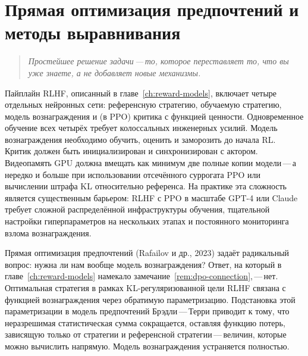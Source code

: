\chapter[DPO и методы выравнивания]{Прямая оптимизация предпочтений и методы выравнивания}
\label{ch:dpo}

\begin{quote}
\itshape
Простейшее решение задачи\,---\,то, которое переставляет то, что вы уже знаете, а не добавляет новые механизмы.
\end{quote}

\bigskip

Пайплайн RLHF, описанный в главе~\ref{ch:reward-models}, включает четыре отдельных нейронных сети: референсную стратегию, обучаемую стратегию, модель вознаграждения и (в PPO) критика с функцией ценности. Одновременное обучение всех четырёх требует колоссальных инженерных усилий. Модель вознаграждения необходимо обучить, оценить и заморозить до начала RL. Критик должен быть инициализирован и синхронизирован с актором. Видеопамять GPU должна вмещать как минимум две полные копии модели\,---\,а нередко и больше при использовании отсечённого суррогата PPO или вычислении штрафа KL относительно референса. На практике эта сложность является существенным барьером: RLHF с PPO в масштабе GPT-4 или Claude требует сложной распределённой инфраструктуры обучения, тщательной настройки гиперпараметров на нескольких этапах и постоянного мониторинга взлома вознаграждения.

Прямая оптимизация предпочтений (Rafailov и др., 2023) задаёт радикальный вопрос: нужна ли нам вообще модель вознаграждения? Ответ, на который в главе~\ref{ch:reward-models} намекало замечание~\ref{rem:dpo-connection},\,---\,нет. Оптимальная стратегия в рамках KL-регуляризованной цели RLHF связана с функцией вознаграждения через обратимую параметризацию. Подстановка этой параметризации в модель предпочтений Брэдли\,---\,Терри приводит к тому, что неразрешимая статистическая сумма сокращается, оставляя функцию потерь, зависящую только от стратегии и референсной стратегии\,---\,величин, которые можно вычислить напрямую. Модель вознаграждения устраняется полностью.

